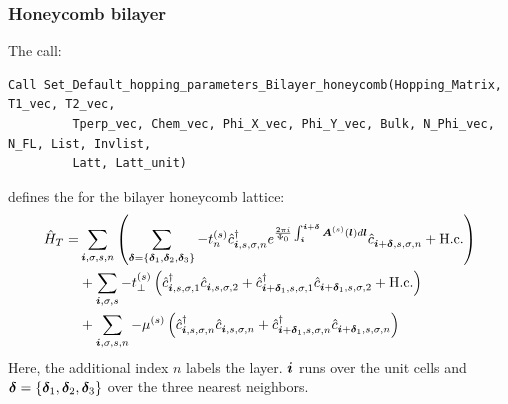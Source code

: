\subsubsection*{Honeycomb  bilayer}
The call:
\begin{lstlisting}[style=fortran]
Call Set_Default_hopping_parameters_Bilayer_honeycomb(Hopping_Matrix, T1_vec, T2_vec,
         Tperp_vec, Chem_vec, Phi_X_vec, Phi_Y_vec, Bulk, N_Phi_vec, N_FL, List, Invlist,
         Latt, Latt_unit)
\end{lstlisting}  
defines  the   for the  bilayer  honeycomb  lattice:                 
\begin{align}
\hat{H}_T  =  &   \sum_{\boldsymbol{i}, \sigma, s,n } \left(  \sum_{ \boldsymbol{\delta} = \left\{ \boldsymbol{\delta}_1, \boldsymbol{\delta}_2, \boldsymbol{\delta}_3 \right\} }  - t_n^{(s)} \hat{c}^{\dagger}_{\boldsymbol{i},s,\sigma,n}   e^{\frac{2 \pi i}{\Phi_0} \int_{\boldsymbol{i}}^{\boldsymbol{i}+ \boldsymbol{\delta}}  \boldsymbol{A}^{(s)}(\boldsymbol{l})  d \boldsymbol{l}}   \hat{c}^{}_{\boldsymbol{i} + \boldsymbol{\delta},s,\sigma,n} +  \mathrm{H.c.} \right)       \nonumber \\
      & +   \sum_{\boldsymbol{i}, \sigma, s } -  t_{\perp}^{(s)}  \left( \hat{c}^{\dagger}_{\boldsymbol{i},s,\sigma,1} \hat{c}^{}_{\boldsymbol{i},s,\sigma,2}   +
                   \hat{c}^{\dagger}_{\boldsymbol{i} + \boldsymbol{\delta}_1,s,\sigma,1} \hat{c}^{}_{\boldsymbol{i} + \boldsymbol{\delta}_1,s,\sigma,2}  + \mathrm{H.c.}  \right)   \nonumber \\
      & +   \sum_{\boldsymbol{i}, \sigma, s, n }  -  \mu^{(s)}  \left(\hat{c}^{\dagger}_{\boldsymbol{i},s,\sigma,n} \hat{c}^{}_{\boldsymbol{i},s,\sigma,n}  +  \hat{c}^{\dagger}_{\boldsymbol{i} + \boldsymbol{\delta}_1,s,\sigma,n} \hat{c}^{}_{\boldsymbol{i} + \boldsymbol{\delta}_1 ,s,\sigma,n}  \right)  
\end{align}
Here, the additional  index  $n$  labels the layer.   $\boldsymbol{i} $   runs over the unit cells  and   $\boldsymbol{\delta} = \left\{ \boldsymbol{\delta}_1, \boldsymbol{\delta}_2, \boldsymbol{\delta}_3 \right\} $  over the three nearest neighbors. 


